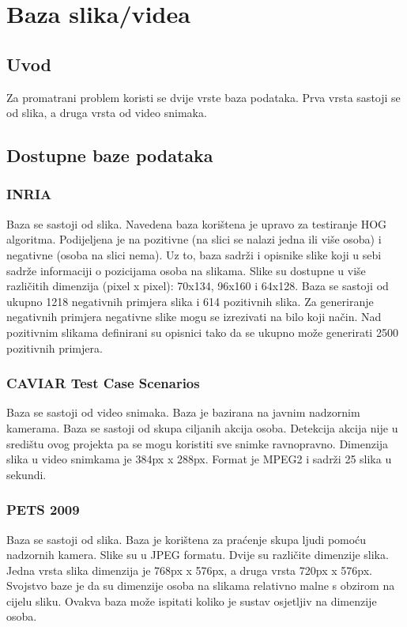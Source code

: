 \documentclass[times, utf8, seminar, numeric]{fer}
\begin{document}
\chapter{Baza slika/videa}

\section{Uvod}

Za promatrani problem koristi se dvije vrste baza podataka. Prva vrsta sastoji 
se od slika, a druga vrsta od video snimaka.  

\section{Dostupne baze podataka}

\subsection{INRIA}

Baza se sastoji od slika. Navedena baza korištena je upravo za testiranje HOG 
algoritma. Podijeljena je na pozitivne (na slici se nalazi jedna ili više osoba)
i negativne (osoba na slici nema). Uz to, baza sadrži i opisnike slike koji
u sebi sadrže informaciji o pozicijama osoba na slikama. Slike su dostupne u
više različitih dimenzija (pixel x pixel): 70x134, 96x160 i 64x128.  
Baza se sastoji od ukupno 1218 negativnih primjera slika i 614 pozitivnih slika.
Za generiranje negativnih primjera negativne slike mogu se izrezivati na bilo
koji način. Nad pozitivnim slikama definirani su opisnici tako da se ukupno 
može generirati 2500 pozitivnih primjera.

\subsection{CAVIAR Test Case Scenarios}

Baza se sastoji od video snimaka. Baza je bazirana na javnim nadzornim kamerama.
Baza se sastoji od skupa ciljanih akcija osoba. Detekcija akcija nije u središtu
ovog projekta pa se mogu koristiti sve snimke ravnopravno. Dimenzija slika u 
video snimkama je 384px x 288px. Format je MPEG2 i sadrži 25 slika u sekundi.

\subsection{PETS 2009}

Baza se sastoji od slika. 
Baza je korištena za praćenje skupa ljudi pomoću nadzornih kamera. Slike su
u JPEG formatu. Dvije su različite dimenzije slika. Jedna vrsta slika dimenzija 
je 768px x 576px, a druga vrsta 720px x 576px. Svojstvo baze je da su dimenzije
osoba na slikama relativno malne s obzirom na cijelu sliku. Ovakva baza može
ispitati koliko je sustav osjetljiv na dimenzije osoba.  
\end{document}
